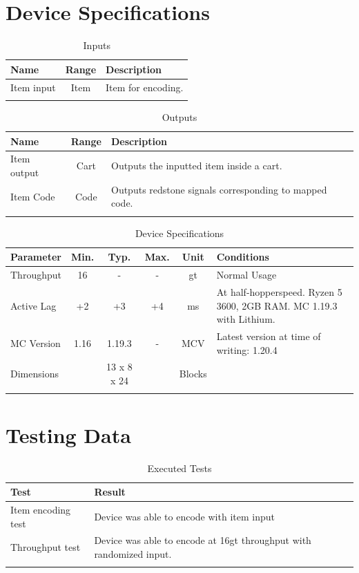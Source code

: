 \documentclass[10pt]{datasheet}
\begin{document}
\section{Device Specifications}

\begin{table}[h]
    \caption{Inputs}
    \begin{tabularx}{\textwidth}{l | c | X}
        \thickhline
        \textbf{Name} & \textbf{Range} & \textbf{Description} \\
        \hline
        Item input & Item & Item for encoding. \\
        \thickhline
\end{tabularx}
\end{table}

\begin{table}[h]
    \caption{Outputs}
    \begin{tabularx}{\textwidth}{l | c | X}
        \thickhline
        \textbf{Name} & \textbf{Range} & \textbf{Description} \\
        \hline
        Item output & Cart & Outputs the inputted item inside a cart. \\
        \hline
        Item Code & Code & Outputs redstone signals corresponding to mapped code. \\
        \thickhline
\end{tabularx}
\end{table}

\begin{table}[h]
    \caption{Device Specifications}
    \begin{tabularx}{\textwidth}{l | c c c | c | X}
        \thickhline
        \textbf{Parameter} & \textbf{Min.} & \textbf{Typ.} & \textbf{Max.} &
        \textbf{Unit} & \textbf{Conditions} \\
        \hline
        Throughput  & 16 & - & - & gt & Normal Usage \\
        \hline
        Active Lag & +2 & +3 & +4 & ms & At half-hopperspeed. Ryzen 5 3600, 2GB RAM. MC 1.19.3 with Lithium. \\
        \hline
        MC Version & 1.16 & 1.19.3 & - & MCV & Latest version at time of writing: 1.20.4\\
        \hline
        Dimensions & & 13 x 8 x 24 & & Blocks & \\
        \thickhline
\end{tabularx}
\end{table}
\newpage
\section{Testing Data}
\begin{table}[h]
\caption{Executed Tests}
\begin{tabularx}{\textwidth}{l | X}
    \thickhline
    \textbf{Test} & \textbf{Result} \\
    \hline
    Item encoding test & Device was able to encode with item input \\
    \hline
    Throughput test & Device was able to encode at 16gt throughput with randomized input. \\
    \thickhline
\end{tabularx}
\end{table}
\end{document}
